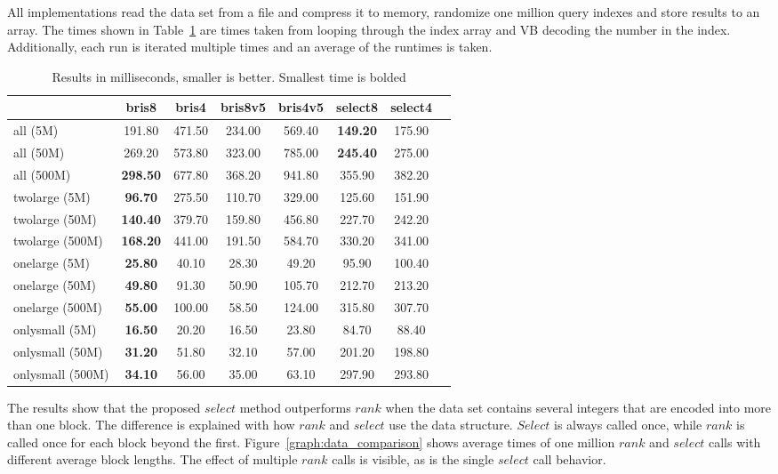All implementations read the data set from a file and compress it to memory, randomize one million query indexes and store results to an array. The times shown in Table~\ref{table:results1} 
are times taken from looping through the index array and VB decoding the number in the index. Additionally, each run is iterated multiple times and an average of the runtimes is taken. 

\begin{table}
\centering
\caption{Results in milliseconds, smaller is better. Smallest time is bolded
\label{table:results1}}
\begin{tabular}{l||c c c c c c c} 
& bris8 & bris4 & bris8v5 & bris4v5 & select8 & select4  \\
 \hline \hline 
all (5M)   & 191.80 & 471.50 & 234.00 & 569.40 & \textbf{149.20} & 175.90 \\
all (50M)   & 269.20 & 573.80 & 323.00 & 785.00 & \textbf{245.40} & 275.00 \\
all (500M)   & \textbf{298.50} & 677.80 & 368.20 & 941.80 & 355.90 & 382.20 \\
twolarge (5M)   & \textbf{96.70} & 275.50 & 110.70 & 329.00 & 125.60 & 151.90 \\
twolarge (50M)   & \textbf{140.40} & 379.70 & 159.80 & 456.80 & 227.70 & 242.20 \\
twolarge (500M)   & \textbf{168.20} & 441.00 & 191.50 & 584.70 & 330.20 & 341.00 \\
onelarge (5M)   & \textbf{25.80} & 40.10 & 28.30 & 49.20 & 95.90 & 100.40 \\
onelarge (50M)   & \textbf{49.80} & 91.30 & 50.90 & 105.70 & 212.70 & 213.20 \\
onelarge (500M)   & \textbf{55.00} & 100.00 & 58.50 & 124.00 & 315.80 & 307.70 \\
onlysmall (5M)   & \textbf{16.50} & 20.20 & 16.50 & 23.80 & 84.70 & 88.40 \\
onlysmall (50M)   & \textbf{31.20} & 51.80 & 32.10 & 57.00 & 201.20 & 198.80 \\
onlysmall (500M)   & \textbf{34.10}  & 56.00 & 35.00 & 63.10 & 297.90 & 293.80 \\

\hline
\end{tabular}
\end{table}

The results show that the proposed $select$ method outperforms $rank$ when the data set contains several integers that are encoded into more than one block. The difference is explained 
with how $rank$ and $select$ use the data structure. $Select$ is always called once, while $rank$ is called once for each block beyond the first. Figure~\ref{graph:data_comparison} shows average times
of one million $rank$ and $select$ calls with different average block lengths. The effect of multiple $rank$ calls is visible, as is the single $select$ call behavior. 

